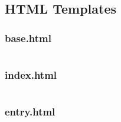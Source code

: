 \documentclass[12pt]{article}
\begin{document}
\subsection{HTML Templates}
\subsubsection{base.html}
\inputminted[breaklines]{htmldjango}{../../../App/templates/base.html}
\subsubsection{index.html}
\inputminted[breaklines]{htmldjango}{../../../App/templates/index.html}
\subsubsection{entry.html}
\inputminted[breaklines]{htmldjango}{../../../App/templates/entry.html}
\end{document}
